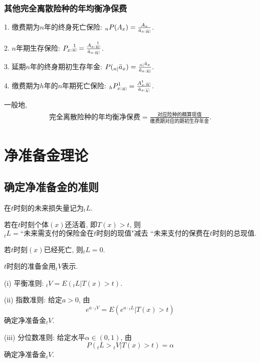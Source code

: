 \documentclass[lang=cn,10pt]{elegantbook}
\makeatletter
\DeclareRobustCommand{\annu}[1]{_{%
    \def\arraystretch{0}%
    \setlength\arraycolsep{1pt}%
    \setlength\arrayrulewidth{.2pt}%
    \begin{array}[b]{@{}c|}\hline
        \\[\arraycolsep]%
        \scriptstyle #1%
    \end{array}%
}}
\makeatother
\begin{document}
\subsection{其他完全离散险种的年均衡净保费}
\begin{proposition}
    1. 缴费期为$n$年的终身死亡保险:
${}_{n}P(A_{x})=\frac{A_{x}}{\ddot{a}_{x:}{}\annu n}$.

2. $n$年期生存保险:
$P_{x:}\overset{1}{{}\annu n}=\frac{A_{x:}\overset{1}{{}\annu n}}{\ddot a_{x:}{}\annu n}$.

3. 延期$n$年的终身期初生存年金:
$P({}_{n|}\ddot a_{x})=\frac{{}_{n|}\ddot a_{x}}{\ddot{a}_{x:}{}\annu n}$.

4. 缴费期为$h$年的$n$年期死亡保险:
${}_{h}P^{1}_{x:}{}_{\annu n}=\frac{A^{1}_{x:}{}\annu n}{\ddot a_{x:}{}{\scriptsize \annu h}}$.
\end{proposition}

\begin{remark}一般地,
    \begin{align*}
  \text{完全离散险种的年均衡净保费}=\frac{\text{对应险种的精算现值}}{\text{缴费期对应的期初生存年金}}.
  \end{align*}
  \end{remark}

\chapter{净准备金理论}
\section{确定净准备金的准则}
\begin{definition}[未来损失量]
    在$t$时刻的未来损失量记为$_tL$.

 若在$t$时刻个体$(x)$还活着, 即$T(x)>t$, 则$${}_tL=\text{``未来需支付的保险金在$t$时刻的现值"减去 ``未来支付的保费在}t\text{时刻的总现值.}$$

若$t$时刻$(x)$已经死亡, 则${}_tL=0.$
\end{definition}

\begin{proposition}
    $t$时刻的准备金用${}_tV$表示.

(i) 平衡准则: ${}_tV=E({}_tL|T(x)>t).$

(ii) 指数准则: 给定$a>0$, 由$$e^{a\cdot{}_tV}=E(e^{a\cdot{}_tL}|T(x)>t)$$确定净准备金${}_tV.$

(iii) 分位数准则: 给定水平$\alpha\in(0,1)$, 由$$P({}_tL>{}_tV|T(x)>t)=\alpha$$确定净准备金${}_tV.$
\end{proposition}
\end{document}
